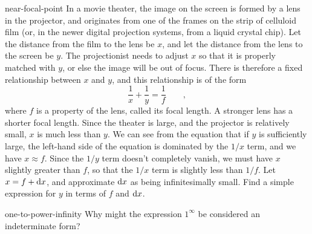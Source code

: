 \begin{hwsection}
%
\begin{hwwithsoln}{near-focal-point}
In a movie theater, the image on the screen is formed by a lens in the projector, and originates from one of the frames on the strip of celluloid film (or,
in the newer digital projection systems, from a liquid crystal chip).
Let the distance from the film to the lens be $x$, and let the distance from the lens to the screen be $y$. The projectionist
needs to adjust $x$ so that it is properly matched with $y$, or else the image will be out of focus. There is therefore
a fixed relationship between $x$ and $y$, and this relationship is of the form
\begin{equation*}
  \frac{1}{x}+\frac{1}{y} = \frac{1}{f} \qquad ,
\end{equation*}
where $f$ is a property of the lens, called its focal length. A stronger lens has a shorter focal length.
Since the theater is large, and the projector is relatively small, $x$ is much less than $y$.
We can see from the equation that if $y$ is sufficiently large, the left-hand side of the equation
is dominated by the $1/x$ term, and we have $x \approx f$. Since the $1/y$ term doesn't completely
vanish, we must have $x$ slightly greater than $f$, so that the $1/x$ term is slightly less than
$1/f$. Let $x=f+\textup{d} x$, and approximate $\textup{d} x$ as being infinitesimally small.
Find a simple expression for $y$ in terms of $f$ and $\textup{d} x$.
\end{hwwithsoln}

\begin{hwwithsoln}{one-to-power-infinity}
Why might the expression $1^\infty$ be considered an indeterminate form?
\end{hwwithsoln}

\end{hwsection}
